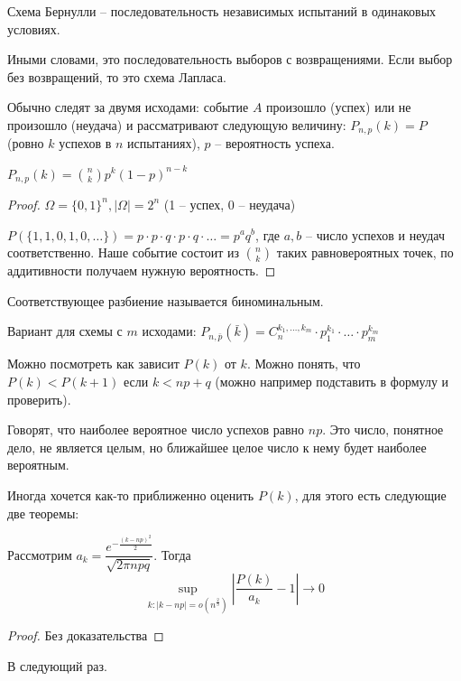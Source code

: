 \begin{Def}
Схема Бернулли -- последовательность независимых испытаний в одинаковых условиях.    
\end{Def}

\begin{Rem}
Иными словами, это последовательность выборов с возвращениями.
Если выбор без возвращений, то это схема Лапласа.
\end{Rem}

Обычно следят за двумя исходами: событие $A$ произошло (успех) или не произошло (неудача) и рассматривают следующую величину:
$P_{n,p}(k) = P$(ровно $k$ успехов в $n$ испытаниях), $p$ -- вероятность успеха.

\begin{theorem}
    $P_{n,p}(k) = {n \choose k} p^k (1-p)^{n-k}$
\end{theorem}
\begin{proof}
    $\Omega = \{0, 1\}^n, |\Omega| = 2^n$ (1 -- успех, 0 -- неудача)

    $P(\{1, 1, 0, 1, 0, \dots \}) = p \cdot p \cdot q \cdot p \cdot q \cdot \dots = p^{a}q^{b}$, где $a, b$ -- число успехов и неудач соответственно.
    Наше событие состоит из ${n \choose k}$ таких равновероятных точек, по аддитивности получаем нужную вероятность.
\end{proof}                                                                  

\begin{Def}
Соответствующее разбиение называется биноминальным.
\end{Def}

Вариант для схемы с $m$ исходами: $P_{n, \bar p}(\bar k) = C_n^{k_1, \dots, k_m} \cdot p_1^{k_1} \cdot \dots \cdot p_m^{k_m}$


Можно посмотреть как зависит $P(k)$ от $k$. Можно понять, что $P(k) < P(k + 1)$ если $k < np + q$ (можно например подставить в формулу и проверить).

Говорят, что наиболее вероятное число успехов равно $np$. Это число, понятное дело, не является целым, но ближайшее целое число к нему будет наиболее вероятным.

Иногда хочется как-то приближенно оценить $P(k)$, для этого есть следующие две теоремы:
\begin{theorem}
Рассмотрим $a_k = \dfrac{e^{-\frac{(k - np)^2}{2}}}{\sqrt{2\pi npq}}$. Тогда
$$\sup_{k\colon |k - np| = o(n^{\frac23})} |\frac{P(k)}{a_k} - 1| \to 0$$
\end{theorem}
\begin{proof}
Без доказательства
\end{proof}
\begin{theorem}
В следующий раз.
\end{theorem}